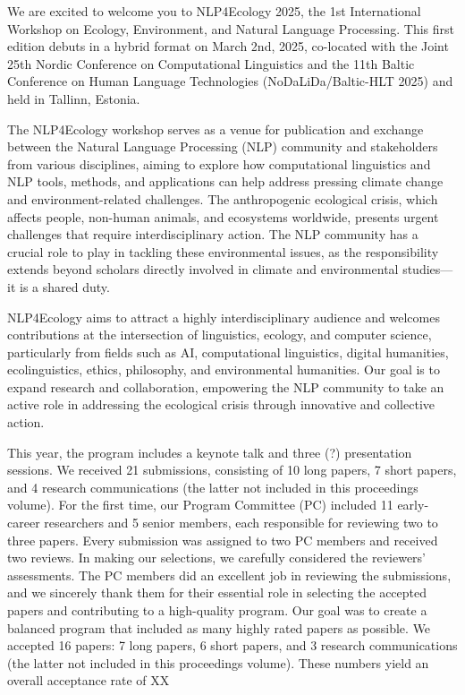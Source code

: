 We are excited to welcome you to NLP4Ecology 2025, the 1st International Workshop on Ecology, Environment, and Natural Language Processing. This first edition debuts in a hybrid format on March 2nd, 2025, co-located with the Joint 25th Nordic Conference on Computational Linguistics and the 11th Baltic Conference on Human Language Technologies (NoDaLiDa/Baltic-HLT 2025) and held in Tallinn, Estonia.

The NLP4Ecology workshop serves as a venue for publication and exchange between the Natural Language Processing (NLP) community and stakeholders from various disciplines, aiming to explore how computational linguistics and NLP tools, methods, and applications can help address pressing climate change and environment-related challenges. The anthropogenic ecological crisis, which affects people, non-human animals, and ecosystems worldwide, presents urgent challenges that require interdisciplinary action. The NLP community has a crucial role to play in tackling these environmental issues, as the responsibility extends beyond scholars directly involved in climate and environmental studies—it is a shared duty.

NLP4Ecology aims to attract a highly interdisciplinary audience and welcomes contributions at the intersection of linguistics, ecology, and computer science, particularly from fields such as AI, computational linguistics, digital humanities, ecolinguistics, ethics, philosophy, and environmental humanities. Our goal is to expand research and collaboration, empowering the NLP community to take an active role in addressing the ecological crisis through innovative and collective action.

This year, the program includes a keynote talk and three (?) presentation sessions. We received 21 submissions, consisting of 10 long papers, 7 short papers, and 4 research communications (the latter not included in this proceedings volume). For the first time, our Program Committee (PC) included 11 early-career researchers and 5 senior members, each responsible for reviewing two to three papers. Every submission was assigned to two PC members and received two reviews. In making our selections, we carefully considered the reviewers’ assessments. The PC members did an excellent job in reviewing the submissions, and we sincerely thank them for their essential role in selecting the accepted papers and contributing to a high-quality program. Our goal was to create a balanced program that included as many highly rated papers as possible. We accepted 16 papers: 7 long papers, 6 short papers, and 3 research communications (the latter not included in this proceedings volume). These numbers yield an overall acceptance rate of XX%

